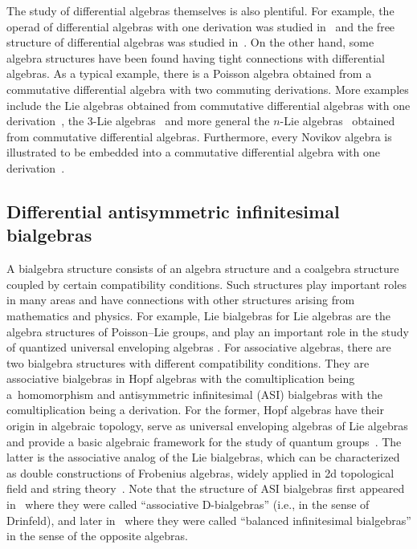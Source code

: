 \documentclass[10pt,a4paper]{amsart}
\numberwithin{equation}{section}
\begin{document}
The study of differential algebras themselves is also plentiful. For example, the
operad of differential algebras with one derivation was studied in~\cite{loday2010operad} and the free structure of differential
algebras was studied in~\cite{guo2008differential}.
On the other hand, some algebra structures have been found having tight connections with differential algebras.
As a typical example, there is a Poisson algebra obtained from a commutative differential algebra with two commuting derivations.
More examples include the Lie algebras obtained from commutative differential algebras with one derivation~\cite{Xu}, the 3-Lie algebras~\cite{nambu1995generalized} and more general the $n$-Lie algebras~\cite{filippov1985n} obtained from commutative differential algebras.
Furthermore, every Novikov algebra is illustrated to be embedded into a commutative differential algebra with one derivation~\cite{bokut2017grobner}.

\subsection{Differential antisymmetric infinitesimal bialgebras}\label{Sec:1.2}

A bialgebra structure consists of an algebra structure and a coalgebra structure coupled by certain compatibility conditions.
Such structures play important roles in many areas and have connections with other structures arising from mathematics and physics.
For example, Lie bialgebras for Lie algebras are the algebra structures of Poisson--Lie groups, and play an important role in the study of quantized universal enveloping algebras \cite{chari1995guide,drinfegammad1983hamiltonian}.
For associative algebras, there are two bialgebra structures with different compatibility conditions.
They are associative bialgebras in Hopf algebras with the comultiplication being a~homomorphism and antisymmetric infinitesimal (ASI) bialgebras with the comultiplication being a derivation.
For the former, Hopf algebras have their origin in algebraic topology, serve as universal enveloping algebras of Lie algebras and provide a basic algebraic framework for the study of quantum groups~\cite{abe2004hopf}.
The latter is the associative analog of the Lie bialgebras, which can be characterized as double constructions of Frobenius algebras, widely applied in 2d topological field and string theory~\cite{AguiarOn, BaiDouble, joni1979coalgebras, kockfrobenius, lauda2008open}.
Note that the structure of ASI bialgebras first appeared in~\cite{zhelyabian1997jordan} where they were called ``associative D-bialgebras'' (i.e., in the sense of Drinfeld), and later in~\cite{AguiarOn} where they were called ``balanced infinitesimal bialgebras'' in the sense of the opposite algebras.
\end{document}
